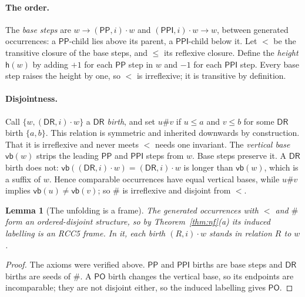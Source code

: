 \documentclass[11pt]{article}
\newcommand{\DR}{\mathsf{DR}}
\newcommand{\PO}{\mathsf{PO}}
\newcommand{\PP}{\mathsf{PP}}
\newcommand{\PPI}{\mathsf{PPI}}
\newcommand{\vb}{\mathsf{vb}}
\newcommand{\hgt}{\mathsf{h}}
\theoremstyle{plain}
\newtheorem{lemma}[theorem]{Lemma}
\theoremstyle{definition}
\begin{document}
\paragraph{The order.} The \emph{base steps} are $w\to(\PP,i)\cdot w$ and
$(\PPI,i)\cdot w\to w$, between generated occurrences: a $\PP$-child lies above
its parent, a $\PPI$-child below it. Let $<$ be the transitive closure of the
base steps, and $\le$ its reflexive closure. Define the \emph{height} $\hgt(w)$
by adding $+1$ for each $\PP$ step in $w$ and $-1$ for each $\PPI$ step. Every
base step raises the height by one, so $<$ is irreflexive; it is transitive by
definition.

\paragraph{Disjointness.} Call $\{w,(\DR,i)\cdot w\}$ a \emph{$\DR$ birth}, and
set $u\#v$ if $u\le a$ and $v\le b$ for some $\DR$ birth $\{a,b\}$. This
relation is symmetric and inherited downwards by construction. That it is
irreflexive and never meets $<$ needs one invariant. The \emph{vertical base}
$\vb(w)$ strips the leading $\PP$ and $\PPI$ steps from $w$. Base steps preserve
it. A $\DR$ birth does not: $\vb((\DR,i)\cdot w)=(\DR,i)\cdot w$ is longer than
$\vb(w)$, which is a suffix of $w$. Hence comparable occurrences have equal
vertical bases, while $u\#v$ implies $\vb(u)\neq\vb(v)$; so $\#$ is irreflexive
and disjoint from $<$.

\begin{lemma}[The unfolding is a frame]\label{lem:frame}
The generated occurrences with $<$ and $\#$ form an ordered-disjoint structure,
so by Theorem~\ref{thm:nf}(a) its induced labelling is an RCC5 frame. In it,
each birth $(R,i)\cdot w$ stands in relation $R$ to $w$.
\end{lemma}

\begin{proof}
The axioms were verified above. $\PP$ and $\PPI$ births are base steps and
$\DR$ births are seeds of $\#$. A $\PO$ birth changes the vertical base, so its
endpoints are incomparable; they are not disjoint either, so the induced
labelling gives $\PO$.
\end{proof}
\end{document}
